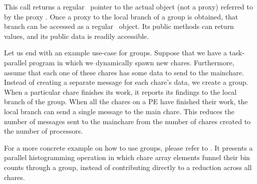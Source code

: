 This call returns a regular \CC\ pointer to the actual object (not a proxy)
referred to by the proxy .  Once a proxy to the
local branch of a group is obtained, that branch can be accessed as a regular
\CC\ object.  Its public methods can return values, and its public data is 
readily accessible.

Let us end with an example use-case for groups.
Suppose that we have a task-parallel program in which we dynamically spawn
new chares. Furthermore, assume that each one of these chares has some data
to send to the mainchare.  Instead of creating a separate message for each 
chare's data, we create a group. When a particular chare
finishes its work, it reports its findings to the local branch of the group.
When all the chares on a PE have finished their work, the local branch
can send a single message to the main chare.  This reduces the number of messages
sent to the mainchare from the number of chares created to the number of processors. 

For a more concrete example on how to use groups, please refer to
. It presents a parallel
histogramming operation in which chare array elements funnel their bin counts
through a group, instead of contributing directly to a reduction across all
chares.

